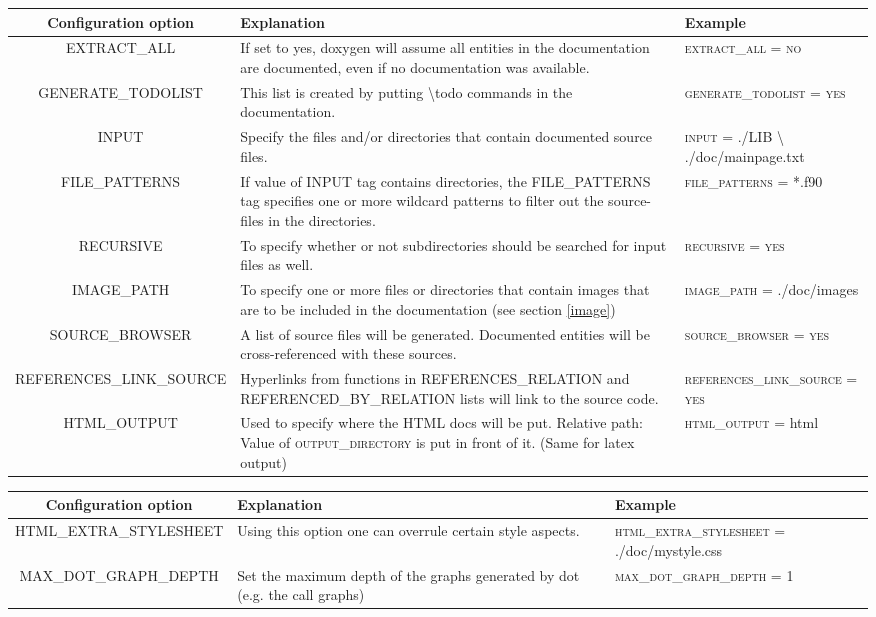 \documentclass[a4paper,11pt,headsepline]{scrartcl}
\begin{document}
\begin{tabular}{|c|L{5.5cm}|L{4.6cm}|}
\hline
Configuration option & Explanation & Example \\ 
\hline
EXTRACT\_ALL & If set to yes, doxygen will assume all entities in the documentation are documented, even if no documentation was available. & \textsc{extract\_all = no}\\
\hline
GENERATE\_TODOLIST & This list is created by putting \textbackslash todo commands in the documentation.& \textsc{generate\_todolist = yes}\\
\hline
INPUT & Specify the files and/or directories that contain documented source files. & \textsc{input} = ./LIB \textbackslash \hfill
		       	 ./doc/mainpage.txt \\
\hline
FILE\_PATTERNS & If value of INPUT tag contains directories, the FILE\_PATTERNS tag specifies one or more wildcard patterns to filter out the source-files in the directories. & \textsc{file\_patterns} = *.f90 \\
\hline
RECURSIVE & To specify whether or not subdirectories should be searched for input files as well. & \textsc{recursive = yes} \\
\hline
IMAGE\_PATH & To specify one or more files or directories that contain images that are to be included in the documentation (see section \ref{image})&  \textsc{image\_path} = ./doc/images \\
 \hline
SOURCE\_BROWSER & A list of source files will be generated. Documented entities will be cross-referenced with these sources.& \textsc{source\_browser = yes} \\
\hline
REFERENCES\_LINK\_SOURCE & Hyperlinks from functions in REFERENCES\_RELATION and REFERENCED\_BY\_RELATION lists will link to the source code. & \textsc{references\_link\_source = yes} \\
\hline
HTML\_OUTPUT & Used to specify where the HTML docs will be put. Relative path: Value of \textsc{output\_directory} is put in front of it. (Same for latex output) & \textsc{html\_output} = html \\
\hline
\end{tabular} 
\begin{tabular}{|c|L{5.5cm}|L{4.6cm}|}
\hline 
Configuration option & Explanation & Example \\ 
\hline
HTML\_EXTRA\_STYLESHEET & Using this option one can overrule certain style aspects. & \textsc{html\_extra\_stylesheet} =  ./doc/mystyle.css \\
\hline
MAX\_DOT\_GRAPH\_DEPTH &  Set the maximum depth of the graphs generated by dot (e.g. the call graphs) & \textsc{max\_dot\_graph\_depth} = 1\\
\hline 
\end{tabular} 
\end{document}
